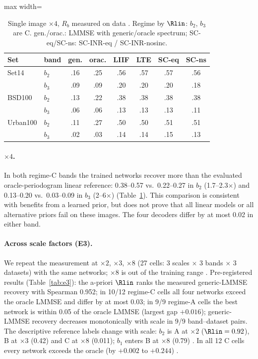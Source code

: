 \begin{table}[t]\centering\small
\caption{Single image $\times4$, $R_b$ measured on data
. Regime by $\Rlin$: $b_2$, $b_3$ are C. gen./orac.: LMMSE with generic/oracle spectrum; SC-eq/SC-ns: SC-INR-eq / SC-INR-nosinc.}
\label{tab:h6c}
\setlength{\tabcolsep}{3pt}
\begin{adjustbox}{max width=\linewidth}\begin{tabular}{llcccccc}\toprule
Set & band & gen. & orac. & LIIF & LTE & SC-eq & SC-ns\\\midrule
Set14 & $b_2$ & .16 & .25 & .56 & .57 & .57 & .56\\
 & $b_3$ & .09 & .09 & .20 & .20 & .20 & .18\\
BSD100 & $b_2$ & .13 & .22 & .38 & .38 & .38 & .38\\
 & $b_3$ & .06 & .06 & .13 & .13 & .13 & .11\\
Urban100 & $b_2$ & .11 & .27 & .50 & .50 & .51 & .51\\
 & $b_3$ & .02 & .03 & .14 & .14 & .15 & .13\\
\bottomrule\end{tabular}\end{adjustbox}
\end{table}

\paragraph{$\times4$.} In both regime-C bands the trained networks recover
more than the evaluated oracle-periodogram linear reference: 0.38--0.57 vs.\ 0.22--0.27 in $b_2$
(1.7--2.3$\times$) and 0.13--0.20 vs.\ 0.03--0.09 in $b_3$ (2--6$\times$)
(Table~\ref{tab:h6c}). This comparison is consistent with benefits from a learned prior, but does not prove that all linear models or all alternative priors fail on these images.
The four decoders differ by at most 0.02 in either band.

\paragraph{Across scale factors (E3).} We repeat the measurement at
$\times2$, $\times3$, $\times8$ (27 cells: 3 scales $\times$ 3 bands $\times$
3 datasets) with the same networks; $\times8$ is out of the training range
. Pre-registered results (Table~\ref{tab:e3}): the a-priori
$\Rlin$ ranks the measured generic-LMMSE recovery with Spearman 0.952; in
10/12 regime-C cells all four networks exceed the oracle LMMSE and differ by
at most 0.03; in 9/9 regime-A cells the best network is within 0.05 of the
oracle LMMSE (largest gap $+0.016$); generic-LMMSE recovery decreases
monotonically with scale in 9/9 band--dataset pairs. The descriptive reference labels change with scale: $b_2$ is A at $\times2$ ($\Rlin=0.92$), B at $\times3$ (0.42) and
C at $\times8$ (0.011); $b_1$ enters B at $\times8$ (0.79)
. In all 12 C cells every network exceeds the oracle
(by $+0.002$ to $+0.244$) .

